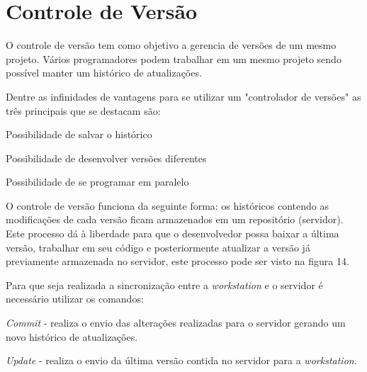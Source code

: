 \section{Controle de Versão}
\label{sec:Controle-de-Versão}

O controle de versão tem como objetivo a gerencia de versões de um mesmo projeto. Vários programadores podem trabalhar em um mesmo projeto sendo possível manter um histórico de atualizações.

Dentre as infinidades de vantagens para se utilizar um "controlador de versões" as três principais que se destacam são:
\begin{alineascomponto}
	
   \item Possibilidade de salvar o histórico
   \item Possibilidade de desenvolver versões diferentes
   \item Possibilidade de se programar em paralelo

	\end{alineascomponto}
	
	
O controle de versão funciona da seguinte forma: os históricos contendo as modificações de cada versão ficam armazenados em um repositório (servidor). Este processo dá à liberdade para que o desenvolvedor possa baixar a última versão, trabalhar em seu código e posteriormente atualizar a versão já previamente armazenada no servidor, este processo pode ser visto na figura 14.

	\begin{figure}[h!]
		\centering
	\end{figure}
	
	Para que seja realizada a sincronização entre a \textit{workstation} e o servidor é necessário utilizar os comandos:
	
	\begin{alineascomponto}
\item \textit{Commit} - realiza o envio das alterações realizadas para o servidor gerando um novo histórico de atualizações.
\item \textit{Update} - realiza o envio da última versão contida no servidor para a \textit{workstation}.
\cite{cv}
	\end{alineascomponto}
	
